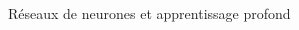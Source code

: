 \documentclass[french]{beamer}
\begin{document}
\begin{frame}{Réseaux de neurones et apprentissage profond}
\begin{columns}[T]
\begin{column}{.52\textwidth}

\end{column}
\end{columns}
\end{frame}
\end{document}
